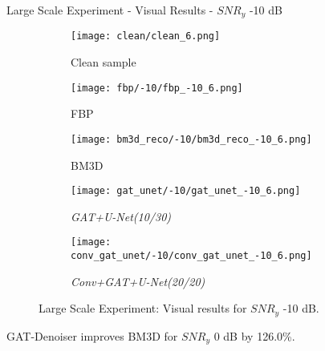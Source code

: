 \begin{frame}{Large Scale Experiment - Visual Results - $SNR_y$ -10 dB}
    \begin{figure}
        \captionsetup[subfigure]{justification=centering}
        \centering
        \begin{subfigure}[t]{0.18\textwidth}
          \texttt{[image: clean/clean\_6.png]}
          \caption{Clean sample}
        \end{subfigure} \hfill
        \begin{subfigure}[t]{0.18\textwidth}
          \texttt{[image: fbp/-10/fbp\_-10\_6.png]}
          \caption{FBP}
        \end{subfigure} \hfill
        \begin{subfigure}[t]{0.18\textwidth}
          \texttt{[image: bm3d\_reco/-10/bm3d\_reco\_-10\_6.png]}
          \caption{BM3D}
        \end{subfigure} \hfill
        \begin{subfigure}[t]{0.18\textwidth}
          \texttt{[image: gat\_unet/-10/gat\_unet\_-10\_6.png]}
          \caption{\textit{GAT+U-Net(10/30)}}
        \end{subfigure} \hfill
        \begin{subfigure}[t]{0.18\textwidth}
          \texttt{[image: conv\_gat\_unet/-10/conv\_gat\_unet\_-10\_6.png]}
          \caption{\textit{Conv+GAT+U-Net(20/20)}}
        \end{subfigure} \hfill
        \caption{Large Scale Experiment: Visual results for $SNR_y$ -10 dB.}
      \end{figure}
      
    
      \begin{tcolorbox}[colback=red!5!white,hide=<1>, alert=<2>, colframe=red!75!black]
        GAT-Denoiser improves BM3D for $SNR_y$ 0 dB by 126.0\%.
        \end{tcolorbox}
        
\end{frame}

